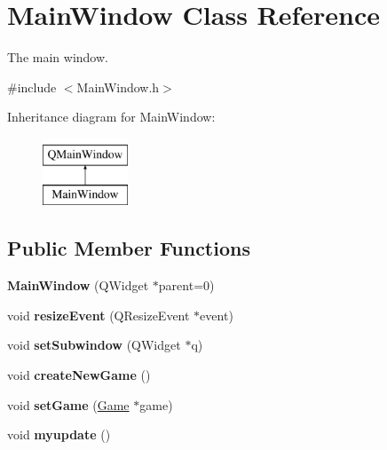 \hypertarget{classMainWindow}{}\section{Main\+Window Class Reference}
\label{classMainWindow}


The main window.  




{\ttfamily \#include $<$Main\+Window.\+h$>$}

Inheritance diagram for Main\+Window\+:\begin{figure}[H]
\begin{center}
\leavevmode
\includegraphics[height=2.000000cm]{classMainWindow}
\end{center}
\end{figure}
\subsection*{Public Member Functions}
\begin{DoxyCompactItemize}
\item 
\mbox{\label{classMainWindow_a8b244be8b7b7db1b08de2a2acb9409db}} 
{\bfseries Main\+Window} (Q\+Widget $\ast$parent=0)
\item 
\mbox{\label{classMainWindow_ae12f8f63791595567b6250f8bb002bda}} 
void {\bfseries resize\+Event} (Q\+Resize\+Event $\ast$event)
\item 
\mbox{\label{classMainWindow_a889d39caf6b396921d972800e2fba819}} 
void {\bfseries set\+Subwindow} (Q\+Widget $\ast$q)
\item 
\mbox{\label{classMainWindow_aa8bd15bfe653d4a823453aa2de06b807}} 
void {\bfseries create\+New\+Game} ()
\item 
\mbox{\label{classMainWindow_a33c0c4b08a759f5c32446d284a811947}} 
void {\bfseries set\+Game} (\hyperlink{classGame}{Game} $\ast$game)
\item 
\mbox{\label{classMainWindow_aa78b3f5e5a1226396581fde03f7f1172}} 
void {\bfseries myupdate} ()
\end{DoxyCompactItemize}
